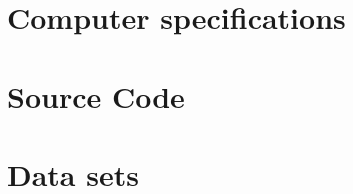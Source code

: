 \appendix

\chapter{Computer specifications}
\label{apdx:computerSpecifications}


\chapter{Source Code}
\label{apdx:sourceCode}


\chapter{Data sets}
\label{apdx:dataSets}


